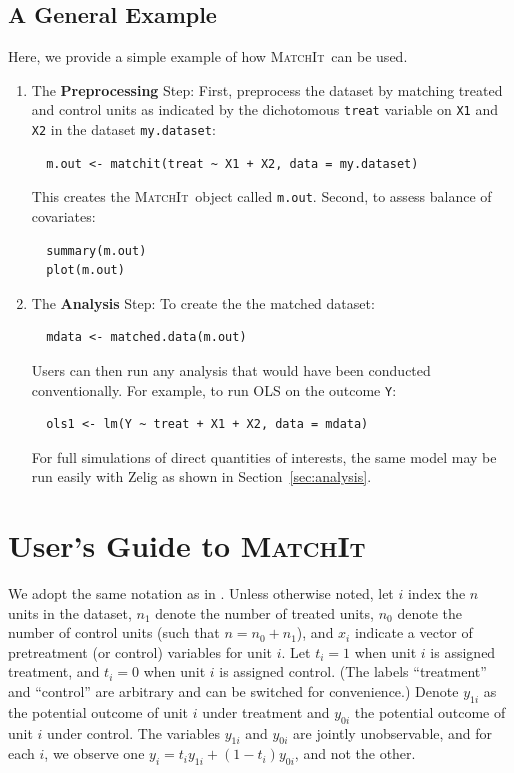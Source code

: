 \documentclass[oneside,letterpaper,titlepage]{article}
\newcommand{\MatchIt}{\textsc{MatchIt}}
\begin{document}
\subsection{A General Example}

Here, we provide a simple example of how \MatchIt\ can be used. 

\begin{enumerate}
  
\item The {\bf Preprocessing} Step: First, preprocess the dataset by matching
  treated and control units as indicated by the dichotomous
  \texttt{treat} variable on \texttt{X1} and \texttt{X2} in the
  dataset \texttt{my.dataset}:
\begin{verbatim}
  m.out <- matchit(treat ~ X1 + X2, data = my.dataset)
\end{verbatim}
  This creates the \MatchIt\ object called \texttt{m.out}.  Second, to
  assess balance of covariates:
\begin{verbatim}
  summary(m.out)
  plot(m.out)
\end{verbatim}

\item The {\bf  Analysis} Step: To create the the matched dataset: 
\begin{verbatim}
  mdata <- matched.data(m.out)
\end{verbatim}
  Users can then run any analysis that would have been conducted
  conventionally.  For example, to run OLS on the outcome \texttt{Y}:
\begin{verbatim}
  ols1 <- lm(Y ~ treat + X1 + X2, data = mdata)
\end{verbatim}
For full simulations of direct quantities of interests, the same model
may be run easily with Zelig as shown in Section~\ref{sec:analysis}.
\end{enumerate}


\section{User's Guide to \MatchIt}
\label{methods}

We adopt the same notation as in \citet{HoImaKin05}. Unless otherwise
noted, let $i$ index the $n$ units in the dataset, $n_1$ denote the
number of treated units, $n_0$ denote the number of control units
(such that $n=n_0+n_1$), and $x_i$ indicate a vector of pretreatment
(or control) variables for unit $i$.  Let $t_i=1$ when unit $i$ is
assigned treatment, and $t_i=0$ when unit $i$ is assigned control.
(The labels ``treatment'' and ``control'' are arbitrary and can be
switched for convenience.)  Denote $y_{1i}$ as the potential outcome
of unit $i$ under treatment and $y_{0i}$ the potential outcome of unit
$i$ under control.  The variables $y_{1i}$ and $y_{0i}$ are jointly
unobservable, and for each $i$, we observe one
$y_i=t_iy_{1i}+(1-t_i)y_{0i}$, and not the other.
\end{document}
